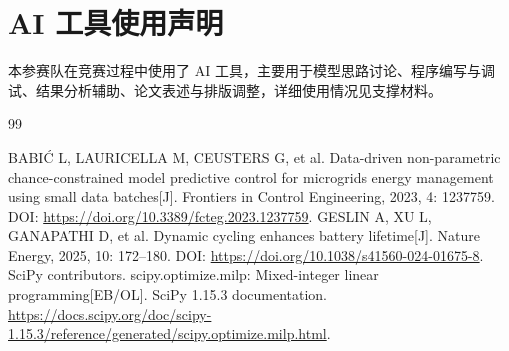 \documentclass[withoutpreface,bwprint]{cumcmthesis}
\begin{document}
\newpage
\section*{AI 工具使用声明}
本参赛队在竞赛过程中使用了 AI 工具，主要用于模型思路讨论、程序编写与调试、结果分析辅助、论文表述与排版调整，详细使用情况见支撑材料。

\begin{thebibliography}{99}
\raggedright
{}
BABIĆ L, LAURICELLA M, CEUSTERS G, et al.
Data-driven non-parametric chance-constrained model predictive control for microgrids energy management using small data batches[J].
Frontiers in Control Engineering, 2023, 4: 1237759.
DOI: \url{https://doi.org/10.3389/fcteg.2023.1237759}.
GESLIN A, XU L, GANAPATHI D, et al.
Dynamic cycling enhances battery lifetime[J].
Nature Energy, 2025, 10: 172--180.
DOI: \url{https://doi.org/10.1038/s41560-024-01675-8}.
SciPy contributors. scipy.optimize.milp: Mixed-integer linear programming[EB/OL].
SciPy 1.15.3 documentation.
\url{https://docs.scipy.org/doc/scipy-1.15.3/reference/generated/scipy.optimize.milp.html}.
\end{thebibliography}
\end{document}
